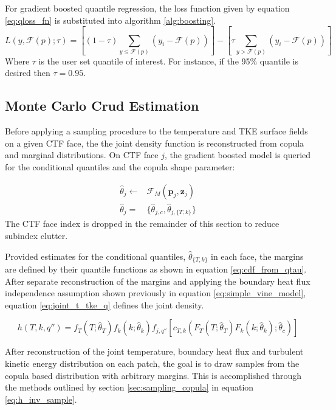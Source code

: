 For gradient boosted quantile regression, the loss function given by equation \ref{eq:qloss_fn} is substituted into algorithm \ref{alg:boosting}.
\begin{equation}
L(y, \mathcal F(p);\tau) = \left[ (1-\tau) \sum_{y \leq \mathcal F(p)}( y_i - \mathcal F(p) ) \right] - \left[ \tau \sum_{y > \mathcal F(p)} (y_i - \mathcal F(p)) \right]
\end{equation}
Where $\tau$ is the user set quantile of interest. For instance, if the 95\% quantile is desired then $\tau=0.95$.



\subsection{Monte Carlo Crud Estimation}
\label{chap:mc_crud}

Before applying a sampling procedure to the temperature and TKE surface fields on a given CTF face, the the joint density function is reconstructed from copula and marginal distributions.   On CTF face $j$, the gradient boosted model is queried for the conditional quantiles and the copula shape parameter:

\begin{align}
\hat \theta_j \leftarrow  & {\mathcal F_M}(\mathbf p_j, \mathbf z_j) \nonumber \\
 \hat \theta_j =& \{\hat \theta_{j,c}, \hat \theta_{j,\{T,k\}} \}
\end{align}
The CTF face index is dropped in the remainder of this section to reduce subindex clutter.

Provided estimates for the conditional quantiles, $\hat \theta_{\{T,k\}}$ in each face, the margins are defined by their quantile functions as shown in equation \ref{eq:cdf_from_qtau}.  After separate reconstruction of the margins and applying the boundary heat flux independence assumption shown previously in equation \ref{eq:simple_vine_model}, equation \ref{eq:joint_t_tke_q} defines the joint density.

\begin{equation}
h(T, k, q'') = f_T(T;\hat \theta_T) f_k(k;\hat \theta_k) f_{j,q''}
[ c_{T,k}(F_T(T;\hat \theta_{T})F_k(k;\hat \theta_{k});\hat \theta_c)]
\label{eq:joint_t_tke_q}
\end{equation}

After reconstruction of the joint temperature, boundary heat flux and turbulent kinetic energy distribution on each patch, the goal is to draw samples from the copula based distribution with arbitrary margins.  This is accomplished through the methods outlined by section \ref{sec:sampling_copula} in equation \ref{eq:h_inv_sample}.

